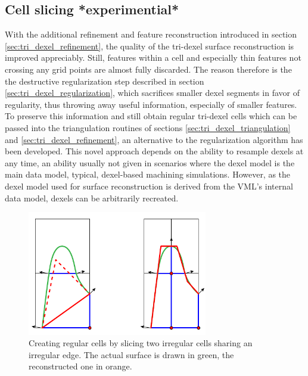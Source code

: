 \subsection{Cell slicing *experimential*}
\label{sec:tri_dexel_cellslicing}

With the additional refinement and feature reconstruction introduced in section \ref{sec:tri_dexel_refinement}, the quality of the tri-dexel surface reconstruction is improved appreciably.
Still, features within a cell and especially thin features not crossing any grid points are almost fully discarded.
The reason therefore is the the destructive regularization step described in section \ref{sec:tri_dexel_regularization}, which sacrifices smaller dexel segments in favor of regularity, thus throwing away useful information, especially of smaller features.
To preserve this information and still obtain regular tri-dexel cells which can be passed into the triangulation routines of sections \ref{sec:tri_dexel_triangulation} and \ref{sec:tri_dexel_refinement}, an alternative to the regularization algorithm has been developed.
This novel approach depends on the ability to resample dexels at any time, an ability usually not given in scenarios where the dexel model is the main data model, \ie typical, dexel-based machining simulations.
However, as the dexel model used for surface reconstruction is derived from the VML's internal data model, dexels can be arbitrarily recreated.

\begin{figure}
	\centering
	\includegraphics[width=0.7\textwidth]{images/tri_dexel_cellslicing}
	\caption{
		Creating regular cells by slicing two irregular cells sharing an irregular edge.
		The actual surface is drawn in green, the reconstructed one in orange.
	}
	\label{fig:tri_dexel_cellslicing}
\end{figure}


